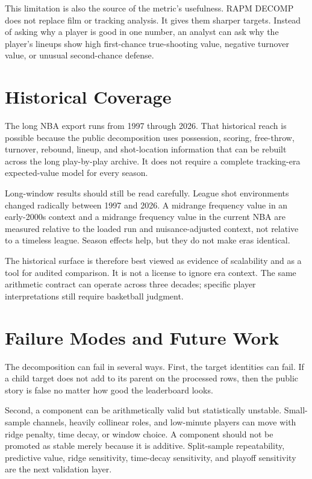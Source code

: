 \documentclass[11pt]{article}
\begin{document}
This limitation is also the source of the metric's usefulness.  RAPM DECOMP
does not replace film or tracking analysis.  It gives them sharper targets.
Instead of asking why a player is good in one number, an analyst can ask why the
player's lineups show high first-chance true-shooting value, negative turnover
value, or unusual second-chance defense.

\section{Historical Coverage}

The long NBA export runs from 1997 through 2026.  That historical reach is
possible because the public decomposition uses possession, scoring,
free-throw, turnover, rebound, lineup, and shot-location information that can
be rebuilt across the long play-by-play archive.  It does not require a
complete tracking-era expected-value model for every season.

Long-window results should still be read carefully.  League shot environments
changed radically between 1997 and 2026.  A midrange frequency value in an
early-2000s context and a midrange frequency value in the current NBA are
measured relative to the loaded run and nuisance-adjusted context, not relative
to a timeless league.  Season effects help, but they do not make eras
identical.

The historical surface is therefore best viewed as evidence of scalability and
as a tool for audited comparison.  It is not a license to ignore era context.
The same arithmetic contract can operate across three decades; specific player
interpretations still require basketball judgment.

\section{Failure Modes and Future Work}

The decomposition can fail in several ways.  First, the target identities can
fail.  If a child target does not add to its parent on the processed rows, then
the public story is false no matter how good the leaderboard looks.

Second, a component can be arithmetically valid but statistically unstable.
Small-sample channels, heavily collinear roles, and low-minute players can move
with ridge penalty, time decay, or window choice.  A component should not be
promoted as stable merely because it is additive.  Split-sample repeatability,
predictive value, ridge sensitivity, time-decay sensitivity, and playoff
sensitivity are the next validation layer.
\end{document}
